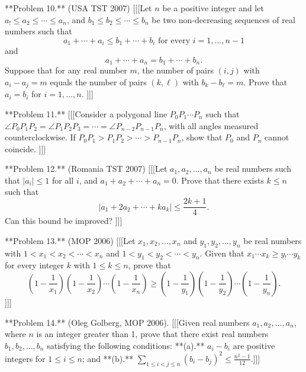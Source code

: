 **Problem 10.** (USA TST 2007) [[[Let $n$ be a positive integer and let $a_! \leq a_2 \leq \cdots \leq a_n$, and $b_1 \leq b_2 \leq \cdots \leq b_n$ be two non-decreasing sequences of real numbers such that  
\[ a_1 + \cdots + a_i \leq b_1 + \cdots + b_i \text{ for every } i = 1, \ldots, n-1 \]  
and  
\[ a_1 + \cdots + a_n = b_1 + \cdots + b_n. \]  
Suppose that for any real number $m$, the number of pairs $(i,j)$ with $a_i - a_j = m$ equals the number of pairs $(k, \ell)$ with $b_k - b_{\ell} = m$. Prove that $a_i = b_i$ for $i = 1, \ldots, n$.  ]]]

**Problem 11.** [[[Consider a polygonal line $P_0 P_1 \cdots P_n$ such that $\angle P_0 P_1 P_2 = \angle P_1 P_2 P_3 = \cdots = \angle P_{n-2} P_{n-1} P_n$, with all angles measured counterclockwise. If $P_0 P_1 > P_1 P_2 > \cdots > P_{n-1} P_n$, show that $P_0$ and $P_n$ cannot coincide.  ]]]

**Problem 12.** (Romania TST 2007) [[[Let $a_1, a_2, \ldots, a_n$ be real numbers such that $|a_i| \leq 1$ for all $i$, and $a_1 + a_2 + \cdots + a_n = 0$. Prove that there exists $k \leq n$ such that  
\[ |a_1 + 2a_2 + \cdots + k a_k| \leq \frac{2k+1}{4}. \]  
Can this bound be improved?  ]]]

**Problem 13.** (MOP 2006) [[[Let $x_1, x_2, \ldots, x_n$ and $y_1, y_2, \ldots, y_n$ be real numbers with $1 < x_1 < x_2 < \cdots < x_n$ and $1 < y_1 < y_2 < \cdots < y_n$. Given that $x_1 \cdots x_k \geq y_! \cdots y_k$ for every integer $k$ with $1 \leq k \leq n$, prove that 
\[ \left(1 - \frac{1}{x_1} \right)\left(1 - \frac{1}{x_2} \right) \cdots \left(1 - \frac{1}{x_n} \right) \geq \left(1 - \frac{1}{y_1} \right)\left(1 - \frac{1}{y_2} \right) \cdots \left(1 - \frac{1}{y_n} \right). \]  ]]]

**Problem 14.** (Oleg Golberg, MOP 2006). [[[Given real numbers $a_1, a_2, \ldots, a_n$, where $n$ is an integer greater than 1, prove that there exist real numbers $b_1, b_2, \ldots, b_n$ satisfying the following conditions:  
**(a).** $a_i - b_i$ are positive integers for $1 \leq i \leq n$; and  
**(b).** $\sum_{1 \leq i < j \leq n} (b_i - b_j)^2 \leq \frac{n^2 - 1}{12}. $]]]